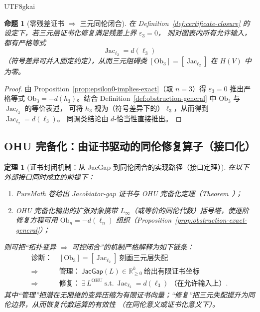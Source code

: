 \documentclass[12pt]{article}
\newtheorem{theorem}{定理}[section]
\newtheorem{proposition}{命题}[section]
\newcommand{\Layer}{\ensuremath{\ell}}
\newcommand{\Jac}{\operatorname{Jac}}
\newcommand{\Ob}{\mathrm{Ob}}
\newcommand{\JacGap}{\ensuremath{\mathsf{JacGap}}}
\newcommand{\code}[1]{\path{#1}}
\begin{document}
\begin{CJK*}{UTF8}{gkai}
\begin{proposition}[零残差证书 $\Rightarrow$ 三元同伦闭合]
\label{prop:certificate-closure-eps0}
在 Definition~\ref{def:certificate-closure} 的设定下，若三元层证书化修复满足残差上界 $\varepsilon_3=0$，
则对图表内所有允许输入，都有严格等式
\[
  \Jac_{\Layer_2} = d(\Layer_3)
\]
（符号差异可并入固定约定），从而三元阻碍类 $[\Ob_3]=[\Jac_{\Layer_2}]$ 在 $H(V)$ 中为零。
\end{proposition}

\begin{proof}
由 Proposition~\ref{prop:epsilon0-implies-exact}（取 $n=3$）得 $\varepsilon_3=0$ 推出严格等式
$\Ob_3=-d(h_3)$。结合 Definition~\ref{def:obstruction-general} 中 $\Ob_3$ 与 $\Jac_{\Layer_2}$ 的等价表述，
可将 $h_3$ 视为（符号差异下的）$\Layer_3$，从而得到 $\Jac_{\Layer_2}=d(\Layer_3)$。
同调类结论由 $d$-恰当性直接推出。
\end{proof}

\subsection{OHU 完备化：由证书驱动的同伦修复算子（接口化）}

\begin{theorem}[证书封闭机制：从 JacGap 到同伦闭合的实现路径（接口定理）]
\label{thm:jacgap-certificate-closure-mechanism}
在以下外部接口同时成立的前提下：
\begin{enumerate}
  \item PureMath 卷给出 Jacobiator-gap 证书与 OHU 完备化定理（Theorem~\code{thm:GZ-OHU}）；
  \item OHU 完备化输出的扩张对象携带 $L_\infty$（或等价的同伦代数）括号塔，使逐阶修复方程可用
        $\Ob_n=-d(\Layer_n)$ 组织（Proposition~\ref{prop:obstruction-exact-general}）；
\end{enumerate}
则可把“拓扑变异 $\Rightarrow$ 可控闭合”的机制严格解释为如下链条：
\[
\begin{aligned}
\textbf{诊断：}\ &[\Ob_3]=[\Jac_{\Layer_2}] \ \text{刻画三元层失配}\\
\Longrightarrow\ &\textbf{管理：}\ \JacGap(L)\in\mathbb{R}_{\ge0}^k\ \text{给出有限证书坐标}\\
\Longrightarrow\ &\textbf{修复：}\ \exists\,L^{\mathrm{OHU}}\ \text{s.t.}\ \Jac_{\Layer_2}=d(\Layer_3)\ \text{（在允许输入上）}.
\end{aligned}
\]
其中“管理”把潜在无限维的变异压缩为有限证书向量；“修复”把三元失配提升为同伦边界，从而恢复代数运算的有效性
（在同伦意义或证书化意义下）。
\end{theorem}


\end{CJK*}
\end{document}
